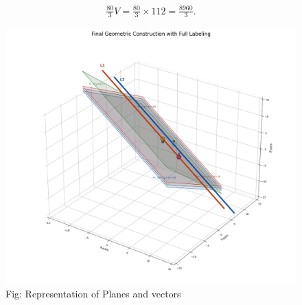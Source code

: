 \documentclass[journal]{IEEEtran}
\begin{document}
\begin{align}
\frac{80}{3}V = \frac{80}{3}\times 112 = \frac{8960}{3}.
\end{align}




\begin{figure}[h!]
  \centering
  \includegraphics[width=0.9\columnwidth]{figs/fig5_.png} 
   \caption*{Fig: Representation of Planes and vectors}
  \label{Fig5}
\end{figure}
\end{document}
